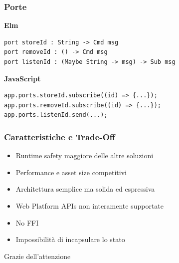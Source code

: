 \documentclass{beamer}
\begin{document}
\begin{frame}[containsverbatim]
  \frametitle{Porte}
  \textbf{Elm}
  \begin{verbatim}
port storeId : String -> Cmd msg
port removeId : () -> Cmd msg
port listenId : (Maybe String -> msg) -> Sub msg
  \end{verbatim}
  \vspace{10pt}
  \textbf{JavaScript}
  \begin{verbatim}
app.ports.storeId.subscribe((id) => {...});
app.ports.removeId.subscribe((id) => {...});
app.ports.listenId.send(...);
  \end{verbatim}
\end{frame}

\begin{frame}
  \frametitle{Caratteristiche e Trade-Off}
  \begin{itemize}
    \item Runtime safety maggiore delle altre soluzioni
    \item Performance e asset size competitivi
    \item Architettura semplice ma solida ed espressiva
    \item Web Platform APIs non interamente supportate
    \item No FFI
    \item Impossibilità di incapsulare lo stato
  \end{itemize}
\end{frame}

\begin{frame}[plain]
  \vfill
  \centering
  \Huge Grazie dell'attenzione
  \vfill
\end{frame}
\end{document}
